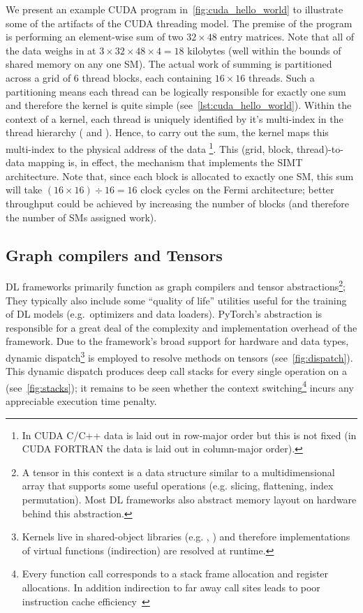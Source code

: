 We present an example CUDA program in~\cref{fig:cuda_hello_world} to illustrate some of the artifacts of the CUDA threading model.
The premise of the program is performing an element-wise sum of two $32 \times 48$ entry matrices.
Note that all of the data weighs in at  $3 \times 32 \times 48 \times 4 = 18$ kilobytes (well within the bounds of shared memory on any one SM).
The actual work of summing is partitioned across a grid of 6 thread blocks, each containing $16 \times 16$ threads.
Such a partitioning means each thread can be logically responsible for exactly one sum and therefore the kernel is quite simple (see~\cref{lst:cuda_hello_world}).
Within the context of a kernel, each thread is uniquely identified by it's multi-index in the thread hierarchy ( and ).
Hence, to carry out the sum, the kernel maps this multi-index to the physical address of the data%
\footnote{In CUDA C/C++ data is laid out in row-major order but this is not fixed (in CUDA FORTRAN the data is laid out in column-major order).}.
This (grid, block, thread)-to-data mapping is, in effect, the mechanism that implements the SIMT architecture.
Note that, since each block is allocated to exactly one SM, this sum will take $\left( 16 \times 16 \right) \div 16 = 16$ clock cycles on the Fermi architecture;
better throughput could be achieved by increasing the number of blocks (and therefore the number of SMs assigned work).



\subsection{Graph compilers and Tensors}\label{subsec:graph-compilers}

DL frameworks primarily function as graph compilers and tensor abstractions\footnote{A tensor in this context is a data structure similar to a multidimensional array that supports some useful operations (e.g. slicing, flattening, index permutation). Most DL frameworks also abstract memory layout on hardware behind this abstraction.};
They typically also include some ``quality of life'' utilities useful for the training of DL models (e.g.\ optimizers and data loaders).
PyTorch's  abstraction is responsible for a great deal of the complexity and implementation overhead of the framework.
Due to the framework's broad support for hardware and data types, dynamic dispatch\footnote{Kernels live in shared-object libraries (e.g. , ) and therefore implementations of virtual functions (indirection) are resolved at runtime.} is employed to resolve methods on tensors (see~\cref{fig:dispatch}).
This dynamic dispatch produces deep call stacks for every single operation on a  (see~\cref{fig:stacks}); it remains to be seen whether the context switching\footnote{Every function call corresponds to a stack frame allocation and register allocations. In addition indirection to far away call sites leads to poor instruction cache efficiency~\cite{10.5555/3314872.3314876}} incurs any appreciable execution time penalty.

